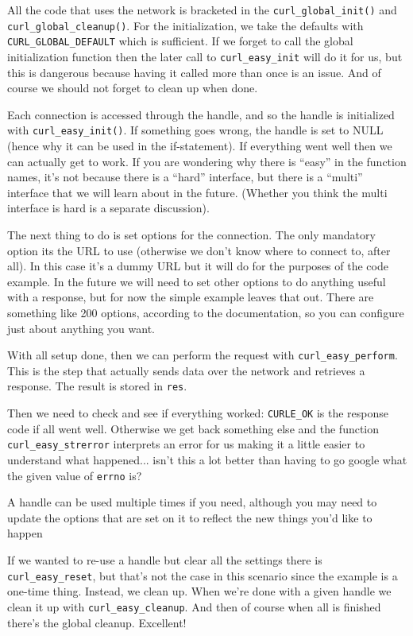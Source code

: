 All the code that uses the network is bracketed in the \texttt{curl\_global\_init()} and \texttt{curl\_global\_cleanup()}. For the initialization, we take the defaults with \texttt{CURL\_GLOBAL\_DEFAULT} which is sufficient. If we forget to call the global initialization function then the later call to \texttt{curl\_easy\_init} will do it for us, but this is dangerous because having it called more than once is an issue. And of course we should not forget to clean up when done.

Each connection is accessed through the handle, and so the handle is initialized with \texttt{curl\_easy\_init()}. If something goes wrong, the handle is set to NULL (hence why it can be used in the if-statement). If everything went well then we can actually get to work. If you are wondering why there is ``easy'' in the function names, it's not because there is a ``hard'' interface, but there is a ``multi'' interface that we will learn about in the future. (Whether you think the multi interface is hard is a separate discussion).

The next thing to do is set options for the connection. The only mandatory option its the URL to use (otherwise we don't know where to connect to, after all). In this case it's a dummy URL but it will do for the purposes of the code example. In the future we will need to set other options to do anything useful with a response, but for now the simple example leaves that out. There are something like 200 options, according to the documentation, so you can configure just about anything you want.

With all setup done, then we can perform the request with \texttt{curl\_easy\_perform}. This is the step that actually sends data over the network and retrieves a response. The result is stored in \texttt{res}.

Then we need to check and see if everything worked: \texttt{CURLE\_OK} is the response code if all went well. Otherwise we get back something else and the function \texttt{curl\_easy\_strerror} interprets an error for us making it a little easier to understand what happened... isn't this a lot better than having to go google what the given value of \texttt{errno} is?

A handle can be used multiple times if you need, although you may need to update the options that are set on it to reflect the new things you'd like to happen

If we wanted to re-use a handle but clear all the settings there is \texttt{curl\_easy\_reset}, but that's not the case in this scenario since the example is a one-time thing. Instead, we clean up. When we're done with a given handle we clean it up with \texttt{curl\_easy\_cleanup}. And then of course when all is finished there's the global cleanup. Excellent!

